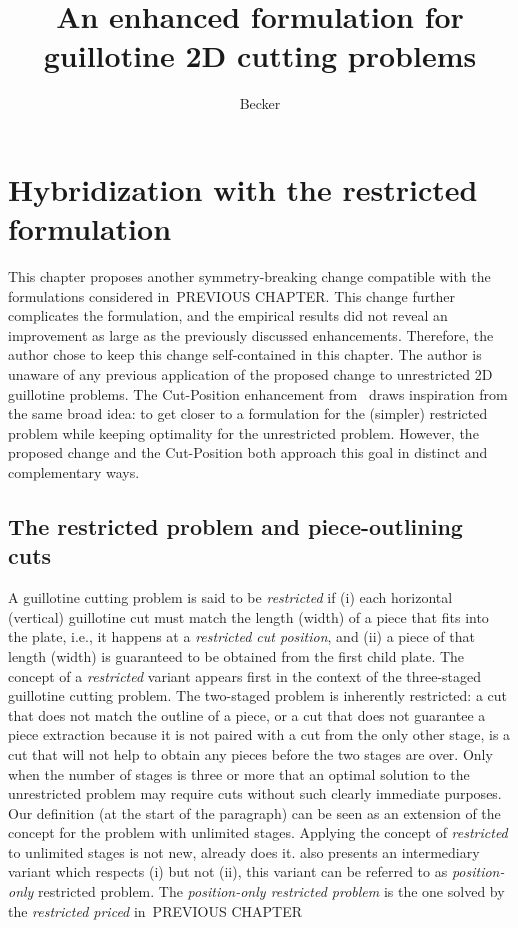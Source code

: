 \documentclass[ppgc,tese,english,formais,babel]{iiufrgs}
\title{An enhanced formulation for guillotine 2D cutting problems
}
\author{Becker}{Henrique}
\begin{document}
\chapter{Hybridization with the restricted formulation}

This chapter proposes another symmetry-breaking change compatible with the formulations considered in~PREVIOUS CHAPTER. %
This change further complicates the formulation, and the empirical results did not reveal an improvement as large as the previously discussed enhancements.
Therefore, the author chose to keep this change self-contained in this chapter.
The author is unaware of any previous application of the proposed change to unrestricted 2D guillotine problems.
The Cut-Position enhancement from~\cite{furini:2016} draws inspiration from the same broad idea: to get closer to a formulation for the (simpler) restricted problem while keeping optimality for the unrestricted problem.
However, the proposed change and the Cut-Position both approach this goal in distinct and complementary ways.

\section{The restricted problem and piece-outlining cuts}

A guillotine cutting problem is said to be \emph{restricted} if (i) each horizontal (vertical) guillotine cut must match the length (width) of a piece that fits into the plate, i.e., it happens at a \emph{restricted cut position}, and (ii) a piece of that length (width) is guaranteed to be obtained from the first child plate.
The concept of a \emph{restricted} variant appears first in the context of the three-staged guillotine cutting problem.
The two-staged problem is inherently restricted: a cut that does not match the outline of a piece, or a cut that does not guarantee a piece extraction because it is not paired with a cut from the only other stage, is a cut that will not help to obtain any pieces before the two stages are over.
Only when the number of stages is three or more that an optimal solution to the unrestricted problem may require cuts without such clearly immediate purposes.
Our definition (at the start of the paragraph) can be seen as an extension of the concept for the problem with unlimited stages.
Applying the concept of \emph{restricted} to unlimited stages is not new, \cite{furini:2016} already does it. \cite{furini:2016} also presents an intermediary variant which respects (i) but not (ii), this variant can be referred to as \emph{position-only} restricted problem.
The \emph{position-only restricted problem} is the one solved by the \emph{restricted priced} in~PREVIOUS CHAPTER%
\end{document}

